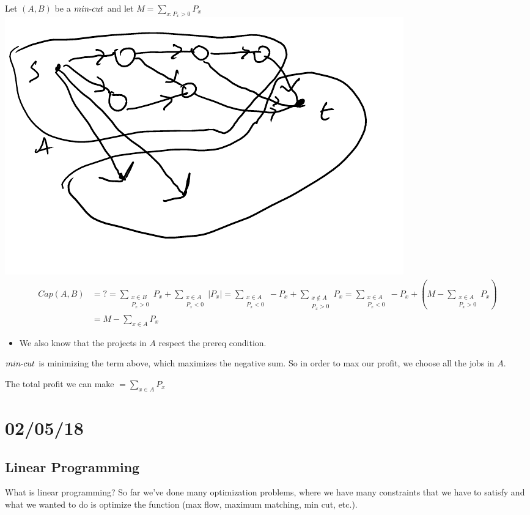 \documentclass[12 pt]{article}
\begin{document}
        Let $(A,B)$ be a $min\hbox{-}cut$ and let $M=\sum_{x:P_x >
          0}P_x$
        \\ \includegraphics[width=.9\textwidth]{i95.pdf}
        \begin{align*}
          Cap(A,B) & = ? = \sum_{\substack{x \in B \\ P_x > 0}} P_x + \sum_{\substack{x \in A \\ P_x < 0}} |P_x| = \sum_{\substack{x \in A \\ P_x < 0}} -P_x + \sum_{\substack{x \notin A \\ P_x > 0}}P_x = \sum_{\substack{x \in A \\ P_x < 0}} - P_x + \left(M - \sum_{\substack{x \in A \\ P_x >0}} P_x\right)
          \\ & = M - \sum_{x \in A} P_x
        \end{align*}
        \begin{itemize}
        \item We also know that the projects in $A$ respect the prereq condition.
        \end{itemize}
        $min\hbox{-}cut$ is minimizing the term above, which maximizes
        the negative sum. So in order to max our profit, we choose
        all the jobs in $A$.
        
        The total profit we can make $= \sum_{x \in A}P_x$
        \section{02/05/18}
        \subsection{Linear Programming}
        What is linear programming? So far we've done many
        optimization problems, where we have many constraints that we
        have to satisfy and what we wanted to do is optimize the
        function (max flow, maximum matching, min cut, etc.).
\end{document}
